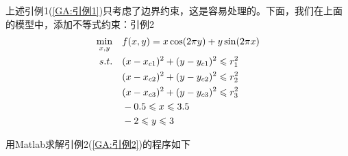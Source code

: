     \par
    上述引例1(\ref{GA:引例1})只考虑了边界约束，这是容易处理的。下面，我们在上面的模型中，添加不等式约束：引例2
    \begin{align}
    \label{GA:引例2}
    \mathop{\min}\limits_{x,y}\quad &f(x,y)=x \cos(2\pi y)+y \sin(2\pi x)\\
    s.t.\quad & (x-x_{c1})^2+(y-y_{c1})^2\leqslant r_1^2 \notag \\
    & (x-x_{c2})^2+(y-y_{c2})^2\leqslant r_2^2\notag \\
    & (x-x_{c3})^2+(y-y_{c3})^2\leqslant r_3^2\notag \\
    &  -0.5\leqslant x\leqslant 3.5\notag \\
    & -2\leqslant y\leqslant 3\notag
    \end{align}
    \par
    用Matlab求解引例2(\ref{GA:引例2})的程序如下
